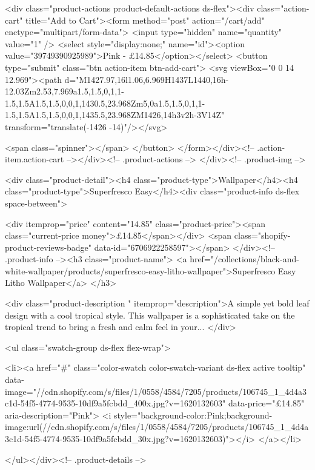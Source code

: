 {{{{{{{<div class="product-actions product-default-actions ds-flex"><div class="action-cart" title="Add to Cart"><form method="post" action="/cart/add" enctype="multipart/form-data">
            <input type="hidden" name="quantity" value="1" />
            <select style="display:none;" name="id"><option value="39749390925989">Pink - £14.85</option></select>
            <button type="submit" class="btn action-item btn-add-cart">
              <svg viewBox="0 0 14 12.969"><path d="M1427.97,16l1.06,6.969H1437L1440,16h-12.03Zm2.53,7.969a1.5,1.5,0,1,1-1.5,1.5A1.5,1.5,0,0,1,1430.5,23.968Zm5,0a1.5,1.5,0,1,1-1.5,1.5A1.5,1.5,0,0,1,1435.5,23.968ZM1426,14h3v2h-3V14Z" transform="translate(-1426 -14)"/></svg>

              <span class="spinner"></span>
            </button>
          </form></div><!-- .action-item.action-cart --></div><!-- .product-actions -->
</div><!-- .product-img -->

<div class="product-detail"><h4 class="product-type">Wallpaper</h4><h4 class="product-type">Superfresco Easy</h4><div class="product-info ds-flex space-between">
    
<div itemprop="price" content="14.85" class="product-price"><span class="current-price money">£14.85</span></div>
    <span class="shopify-product-reviews-badge" data-id="6706922258597"></span>
  </div><!-- .product-info --><h3 class="product-name">
      <a href="/collections/black-and-white-wallpaper/products/superfresco-easy-litho-wallpaper">Superfresco Easy Litho Wallpaper</a>
    </h3>
    
<div class="product-description " itemprop="description">A simple yet bold leaf design with a cool tropical style. This wallpaper is a sophisticated take on the tropical trend to bring a fresh and calm feel in your...
</div>



<ul class="swatch-group ds-flex flex-wrap">
        
<li><a href="#" class="color-swatch color-swatch-variant ds-flex active tooltip" data-image="//cdn.shopify.com/s/files/1/0558/4584/7205/products/106745_1_4d4a3c1d-54f5-4774-9535-10df9a5fcbdd_400x.jpg?v=1620132603" data-price="£14.85" aria-description="Pink">
              <i style="background-color:Pink;background-image:url(//cdn.shopify.com/s/files/1/0558/4584/7205/products/106745_1_4d4a3c1d-54f5-4774-9535-10df9a5fcbdd_30x.jpg?v=1620132603)"></i>
            </a></li>

      </ul></div><!-- .product-details -->

}}}}}}}
